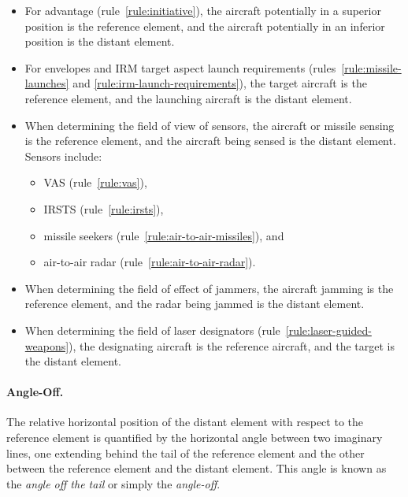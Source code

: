 {\begin{itemize}
\item For advantage (rule~\ref{rule:initiative}), the aircraft potentially in a superior position is the reference element, and the aircraft potentially in an inferior position is the distant element.

\item For envelopes and IRM target aspect launch requirements (rules~\ref{rule:missile-launches} and \ref{rule:irm-launch-requirements}), the target aircraft is the reference element, and the launching aircraft is the distant element.

\item When determining the field of view of sensors, the aircraft or missile sensing is the reference element, and the aircraft being sensed is the distant element. Sensors include:
\begin{itemize} 
\item VAS (rule~\ref{rule:vas}),
\item IRSTS (rule~\ref{rule:irsts}),
\item missile seekers (rule~\ref{rule:air-to-air-missiles}), and
\item air-to-air radar (rule~\ref{rule:air-to-air-radar}).
\end{itemize}


\item When determining the field of effect of jammers, the aircraft jamming is the reference element, and the radar being jammed is the distant element.

\item When determining the field of laser designators (rule~\ref{rule:laser-guided-weapons}), the designating aircraft is the reference aircraft, and the target is the distant element.

\end{itemize}





\paragraph{Angle-Off.} 

The relative horizontal position of the distant element with respect to the reference element is quantified by the horizontal angle between two imaginary lines, one extending behind the tail of the reference element and the other between the reference element and the distant element. This angle is known as the \emph{angle off the tail} or simply the \emph{angle-off}. 

}
